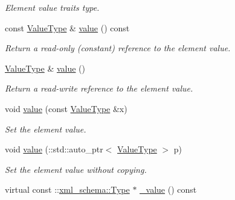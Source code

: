 \begin{DoxyCompactItemize}
\begin{DoxyCompactList}\small\item\em Element value traits type. \item\end{DoxyCompactList}\item 
const \hyperlink{classopenstack_1_1xml_1_1ServerCapacityUnavailableAPIFault}{ValueType} \& \hyperlink{classopenstack_1_1xml_1_1ServerCapacityUnavailable_a927e0a8f2cf6c074f73a68680f7ea103}{value} () const 
\begin{DoxyCompactList}\small\item\em Return a read-\/only (constant) reference to the element value. \item\end{DoxyCompactList}\item 
\hyperlink{classopenstack_1_1xml_1_1ServerCapacityUnavailableAPIFault}{ValueType} \& \hyperlink{classopenstack_1_1xml_1_1ServerCapacityUnavailable_a94c314ad3a98abddc0af3d413a2770bd}{value} ()
\begin{DoxyCompactList}\small\item\em Return a read-\/write reference to the element value. \item\end{DoxyCompactList}\item 
void \hyperlink{classopenstack_1_1xml_1_1ServerCapacityUnavailable_a7905e0d3099746559521a3700dea5713}{value} (const \hyperlink{classopenstack_1_1xml_1_1ServerCapacityUnavailableAPIFault}{ValueType} \&x)
\begin{DoxyCompactList}\small\item\em Set the element value. \item\end{DoxyCompactList}\item 
void \hyperlink{classopenstack_1_1xml_1_1ServerCapacityUnavailable_a8ca7cf98f7914f975d7b56656d59a68e}{value} (::std::auto\_\-ptr$<$ \hyperlink{classopenstack_1_1xml_1_1ServerCapacityUnavailableAPIFault}{ValueType} $>$ p)
\begin{DoxyCompactList}\small\item\em Set the element value without copying. \item\end{DoxyCompactList}\item 
virtual const ::\hyperlink{namespacexml__schema_ad34e8fd175bf4f9fece6c670b01aa239}{xml\_\-schema::Type} $\ast$ \hyperlink{classopenstack_1_1xml_1_1ServerCapacityUnavailable_aad701d5f221d2a734d60b89b303e740b}{\_\-value} () const 

\end{DoxyCompactItemize}
